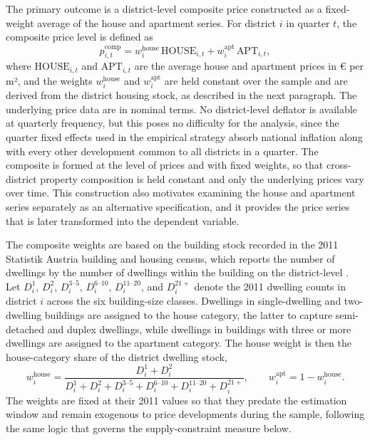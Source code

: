 \documentclass[a4paper,12pt, headsepline]{scrartcl}
\numberwithin{equation}{section}
\begin{document}
The primary outcome is a district-level composite price constructed as a fixed-weight average of the house and apartment series. For district $i$ in quarter $t$, the composite price level is defined as
\begin{equation}\label{eq:composite}
	p^{\text{comp}}_{i,t} = w^{\text{house}}_i\,\text{HOUSE}_{i,t} + w^{\text{apt}}_i\,\text{APT}_{i,t},
\end{equation}
where $\text{HOUSE}_{i,t}$ and $\text{APT}_{i,t}$ are the average house and apartment prices in € per m², and the weights $w^{\text{house}}_i$ and $w^{\text{apt}}_i$ are held constant over the sample and are derived from the district housing stock, as described in the next paragraph. The underlying price data are in nominal terms. No district-level deflator is available at quarterly frequency, but this poses no difficulty for the analysis, since the quarter fixed effects used in the empirical strategy absorb national inflation along with every other development common to all districts in a quarter. The composite is formed at the level of prices and with fixed weights, so that cross-district property composition is held constant and only the underlying prices vary over time. This construction also motivates examining the house and apartment series separately as an alternative specification, and it provides the price series that is later transformed into the dependent variable.

The composite weights are based on the building stock recorded in the 2011 Statistik Austria building and housing census, which reports the number of dwellings by the number of dwellings within the building on the district-level \citep{statistikaustria_dwellings}. Let $D^{1}_i$, $D^{2}_i$, $D^{3\text{--}5}_i$, $D^{6\text{--}10}_i$, $D^{11\text{--}20}_i$, and $D^{21+}_i$ denote the 2011 dwelling counts in district $i$ across the six building-size classes. Dwellings in single-dwelling and two-dwelling buildings are assigned to the house category, the latter to capture semi-detached and duplex dwellings, while dwellings in buildings with three or more dwellings are assigned to the apartment category. The house weight is then the house-category share of the district dwelling stock,
\begin{equation}\label{eq:weights}
	w^{\text{house}}_i = \frac{D^{1}_i + D^{2}_i}{D^{1}_i + D^{2}_i + D^{3\text{--}5}_i + D^{6\text{--}10}_i + D^{11\text{--}20}_i + D^{21+}_i},
	\qquad
	w^{\text{apt}}_i = 1 - w^{\text{house}}_i.
\end{equation}
The weights are fixed at their 2011 values so that they predate the estimation window and remain exogenous to price developments during the sample, following the same logic that governs the supply-constraint measure below.
\end{document}
